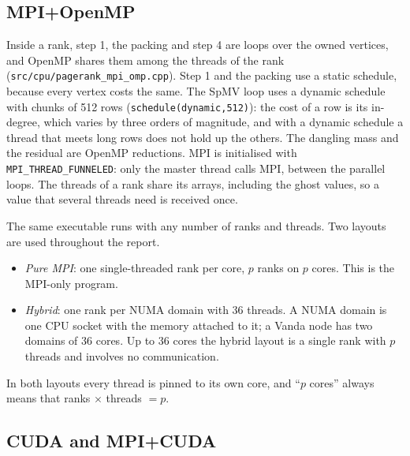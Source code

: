 \documentclass[11pt,a4paper]{article}
\newcommand{\code}[1]{\texttt{#1}}
\begin{document}
\subsection{MPI+OpenMP}

Inside a rank, step 1, the packing and step 4 are loops over the owned vertices, and OpenMP shares them among the
threads of the rank (\code{src/cpu/pagerank\_mpi\_omp.cpp}). Step 1 and the packing use a static schedule, because
every vertex costs the same. The SpMV loop uses a dynamic schedule with chunks of 512 rows
(\code{schedule(dynamic,512)}): the cost of a row is its in-degree, which varies by three orders of magnitude, and
with a dynamic schedule a thread that meets long rows does not hold up the others. The dangling mass and the residual are OpenMP reductions. MPI is initialised with
\code{MPI\_THREAD\_FUNNELED}: only the master thread calls MPI, between the parallel loops. The threads of a rank
share its arrays, including the ghost values, so a value that several threads need is received once.

The same executable runs with any number of ranks and threads. Two layouts are used throughout the report.
\begin{itemize}
\item \emph{Pure MPI}: one single-threaded rank per core, $p$ ranks on $p$ cores. This is the MPI-only program.
\item \emph{Hybrid}: one rank per NUMA domain with 36 threads. A NUMA domain is one CPU socket with the memory
  attached to it; a Vanda node has two domains of 36 cores. Up to 36 cores the hybrid layout is a single rank with
  $p$ threads and involves no communication.
\end{itemize}
In both layouts every thread is pinned to its own core, and ``$p$ cores'' always means that ranks $\times$ threads
$=p$.

\subsection{CUDA and MPI+CUDA}
\end{document}

